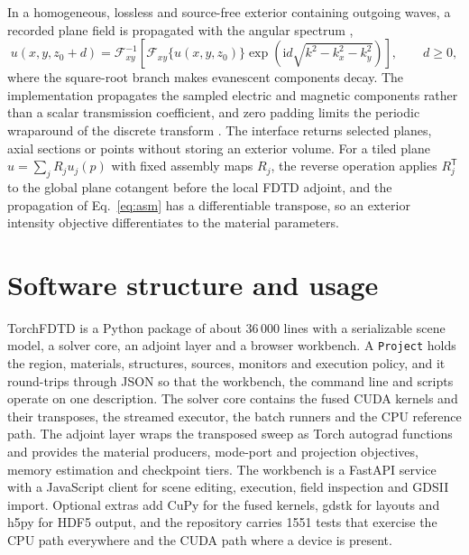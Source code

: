 \documentclass[11pt,a4paper]{article}
\newcommand{\code}[1]{{\small\nolinkurl{#1}}}
\begin{document}
In a homogeneous, lossless and source-free exterior containing outgoing waves, a recorded plane field is propagated with the angular spectrum \citep{goodman2005},
\begin{equation}
u(x,y,z_0+d)=\mathcal{F}^{-1}_{xy}
 \left[\mathcal{F}_{xy}\{u(x,y,z_0)\}
 \exp\!\left(\mathrm{i}d\sqrt{k^2-k_x^2-k_y^2}\right)\right],
\qquad d\geq0,
\label{eq:asm}
\end{equation}
where the square-root branch makes evanescent components decay. The implementation propagates the sampled electric and magnetic components rather than a scalar transmission coefficient, and zero padding limits the periodic wraparound of the discrete transform \citep{matsushima2009}. The interface returns selected planes, axial sections or points without storing an exterior volume. For a tiled plane $u=\sum_j R_j u_j(p)$ with fixed assembly maps $R_j$, the reverse operation applies $R_j^{\mathsf T}$ to the global plane cotangent before the local FDTD adjoint, and the propagation of Eq.~\eqref{eq:asm} has a differentiable transpose, so an exterior intensity objective differentiates to the material parameters.

\section{Software structure and usage}
\label{sec:software}

TorchFDTD is a Python package of about 36\,000 lines with a serializable scene model, a solver core, an adjoint layer and a browser workbench. A \code{Project} holds the region, materials, structures, sources, monitors and execution policy, and it round-trips through JSON so that the workbench, the command line and scripts operate on one description. The solver core contains the fused CUDA kernels and their transposes, the streamed executor, the batch runners and the CPU reference path. The adjoint layer wraps the transposed sweep as Torch autograd functions and provides the material producers, mode-port and projection objectives, memory estimation and checkpoint tiers. The workbench is a FastAPI service with a JavaScript client for scene editing, execution, field inspection and GDSII import. Optional extras add CuPy for the fused kernels, gdstk for layouts and h5py for HDF5 output, and the repository carries 1551 tests that exercise the CPU path everywhere and the CUDA path where a device is present.
\end{document}

